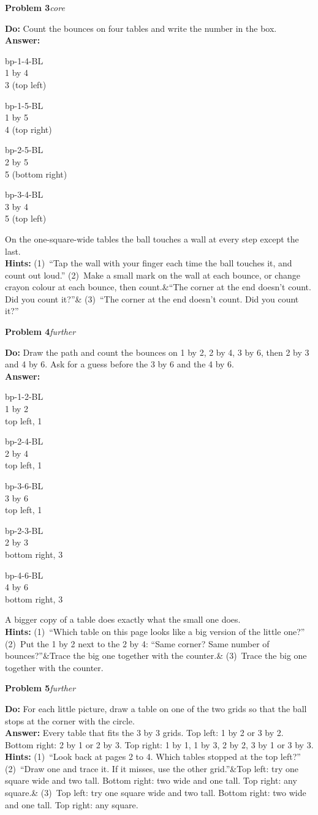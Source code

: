 \documentclass[11pt,letterpaper]{article}
\newcommand{\bp}[3]{\csname bp-#1-#2-#3\endcsname}
\newcommand{\thumb}[5]{\begin{minipage}[b]{#4}\centering\bp{#1}{#2}{#3}\\[2pt]{\footnotesize #5}\end{minipage}}
\newcommand{\prob}[3]{\needspace{3\baselineskip}\par\smallskip\textbf{#1}\enspace\textit{#2}\enspace{\small(#3)}\par}
\newcommand{\what}{\textbf{Do:} }
\newcommand{\ans}{\textbf{Answer:} }
\newcommand{\hints}[3]{\textbf{Hints:} (1)~#1 (2)~#2\ifx&#3&\else{} (3)~#3\fi\par}
\newcommand{\core}{core}
\newcommand{\further}{further}
\begin{document}
\prob{Problem 3}{\core}{page 3}
\what Count the bounces on four tables and write the number in the box.\\
\ans\par\nopagebreak
\thumb{1}{4}{BL}{0.95in}{1 by 4\\3 (top left)}\hfill
\thumb{1}{5}{BL}{0.95in}{1 by 5\\4 (top right)}\hfill
\thumb{2}{5}{BL}{0.95in}{2 by 5\\5 (bottom right)}\hfill
\thumb{3}{4}{BL}{0.95in}{3 by 4\\5 (top left)}\par
On the one-square-wide tables the ball touches a wall at every step except the last.\\
\hints{``Tap the wall with your finger each time the ball touches it, and count out loud.''}{Make a small mark on the wall at each bounce, or change crayon colour at each bounce, then count.}{``The corner at the end doesn't count. Did you count it?''}

\prob{Problem 4}{\further}{pages 4--5}
\what Draw the path and count the bounces on 1 by 2, 2 by 4, 3 by 6, then 2 by 3 and 4 by 6. Ask for a guess before the 3 by 6 and the 4 by 6.\\
\ans\par\nopagebreak
\thumb{1}{2}{BL}{0.95in}{1 by 2\\top left, 1}\hfill
\thumb{2}{4}{BL}{0.95in}{2 by 4\\top left, 1}\hfill
\thumb{3}{6}{BL}{0.95in}{3 by 6\\top left, 1}\hfill
\thumb{2}{3}{BL}{0.95in}{2 by 3\\bottom right, 3}\hfill
\thumb{4}{6}{BL}{0.95in}{4 by 6\\bottom right, 3}\par
A bigger copy of a table does exactly what the small one does.\\
\hints{``Which table on this page looks like a big version of the little one?''}{Put the 1 by 2 next to the 2 by 4: ``Same corner? Same number of bounces?''}{Trace the big one together with the counter.}

\prob{Problem 5}{\further}{page 6}
\what For each little picture, draw a table on one of the two grids so that the ball stops at the corner with the circle.\\
\ans Every table that fits the 3 by 3 grids. Top left: 1 by 2 or 3 by 2. Bottom right: 2 by 1 or 2 by 3. Top right: 1 by 1, 1 by 3, 2 by 2, 3 by 1 or 3 by 3.\\
\hints{``Look back at pages 2 to 4. Which tables stopped at the top left?''}{``Draw one and trace it. If it misses, use the other grid.''}{Top left: try one square wide and two tall. Bottom right: two wide and one tall. Top right: any square.}
\end{document}
